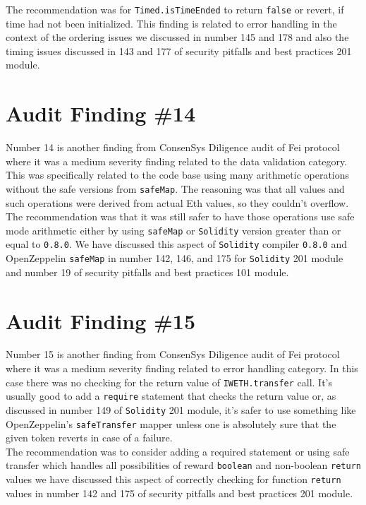The recommendation was for \verb|Timed.isTimeEnded| to return \verb|false| or revert, if time had not been initialized. This finding is related to error handling in the context of the ordering issues we discussed in number 145 and 178 and also the timing issues discussed in 143 and 177 of security pitfalls and best practices 201 module.

\section{Audit Finding \#14}

Number 14 is another finding from ConsenSys Diligence audit of Fei protocol where it was a medium severity finding related to the data validation category. This was specifically related to the code base using many arithmetic operations without the safe versions from \verb|safeMap|. The reasoning was that all values and such operations were derived from actual Eth values, so they couldn't overflow.\\

The recommendation was that it was still safer to have those operations use safe mode arithmetic either by using \verb|safeMap| or \verb|Solidity| version greater than or equal to \verb|0.8.0|. We have discussed this aspect of \verb|Solidity| compiler \verb|0.8.0| and OpenZeppelin \verb|safeMap| in number 142, 146, and 175 for \verb|Solidity| 201 module and number 19 of security pitfalls and best practices 101 module.

\section{Audit Finding \#15}

Number 15 is another finding from ConsenSys Diligence audit of Fei protocol where it was a medium severity finding related to error handling category. In this case there was no checking for the return value of \verb|IWETH.transfer| call. It's usually good to add a \verb|require| statement that checks the return value or, as discussed in number 149 of \verb|Solidity| 201 module, it's safer to use something like OpenZeppelin's \verb|safeTransfer| mapper unless one is absolutely sure that the given token reverts in case of a failure.\\

The recommendation was to consider adding a required statement or using safe transfer which handles all possibilities of reward \verb|boolean| and non-boolean \verb|return| values we have discussed this aspect of correctly checking for function \verb|return| values in number 142 and 175 of security pitfalls and best practices 201 module.

